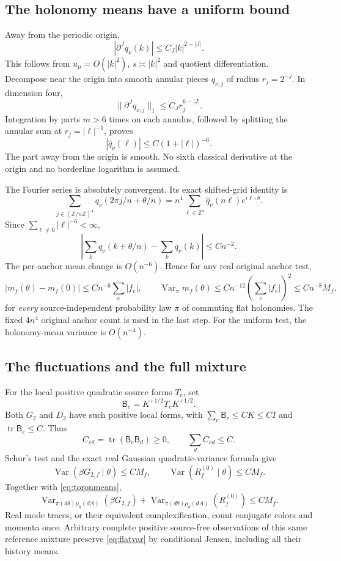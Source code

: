 \documentclass[11pt,letterpaper]{article}
\theoremstyle{remark}\newtheorem{remark}[theorem]{Remark}
\newcommand{\Var}{\operatorname{Var}}\newcommand{\Cov}{\operatorname{Cov}}
\newcommand{\tr}{\operatorname{tr}}
\begin{document}
\subsection{The holonomy means have a uniform bound}

Away from the periodic origin,
\[
 |\partial^Jq_\nu(k)|\le C_J|k|^{2-|J|}.
\]
This follows from \(u_\mu=O(|k|^2)\), \(s\asymp|k|^2\) and quotient differentiation. Decompose near the origin into smooth annular pieces \(q_{\nu,j}\) of radius \(r_j=2^{-j}\). In dimension four,
\[
 \|\partial^Jq_{\nu,j}\|_1\le C_Jr_j^{6-|J|}.
\]
Integration by parts \(m>6\) times on each annulus, followed by splitting the annular sum at \(r_j=|\ell|^{-1}\), proves
\[
 |\widehat q_\nu(\ell)|\le C(1+|\ell|)^{-6}.
\]
The part away from the origin is smooth. No sixth classical derivative at the origin and no borderline logarithm is assumed.

The Fourier series is absolutely convergent. Its exact shifted-grid identity is
\[
 \sum_{j\in(\mathbb Z/n\mathbb Z)^4}
 q_\nu(2\pi j/n+\theta/n)
 =n^4\sum_{\ell\in\mathbb Z^4}
 \widehat q_\nu(n\ell)e^{i\ell\cdot\theta}.
\]
Since \(\sum_{\ell\ne0}|\ell|^{-6}<\infty\),
\[
 \left|\sum_kq_\nu(k+\theta/n)-\sum_kq_\nu(k)\right|
 \le Cn^{-2}.
\]
The per-anchor mean change is \(O(n^{-6})\). Hence for any real original anchor test,
\begin{equation}\label{eq:toronmeans}
 |m_f(\theta)-m_f(0)|\le Cn^{-6}\sum_e|f_e|,
 \qquad
 \Var_\pi m_f(\theta)
 \le Cn^{-12}\left(\sum_e|f_e|\right)^2
 \le Cn^{-8}M_f,
\end{equation}
for \emph{every} source-independent probability law \(\pi\) of commuting flat holonomies. The fixed \(4n^4\) original anchor count is used in the last step. For the uniform test, the holonomy-mean variance is \(O(n^{-4})\).

\subsection{The fluctuations and the full mixture}

For the local positive quadratic source forms \(T_e\), set
\[
 \mathsf B_e=K^{+1/2}T_eK^{+1/2}.
\]
Both \(G_2\) and \(D_2\) have such positive local forms, with
\(\sum_e\mathsf B_e\le CK\le CI\) and \(\tr\mathsf B_e\le C\). Thus
\[
 C_{ed}=\tr(\mathsf B_e\mathsf B_d)\ge0,\qquad
 \sum_d C_{ed}\le C.
\]
Schur's test and the exact real Gaussian quadratic-variance formula give
\[
 \Var(\beta G_{2,f}\mid\theta)\le CM_f,\qquad
 \Var(R_f^{(0)}\mid\theta)\le CM_f.
\]
Together with \eqref{eq:toronmeans},
\begin{equation}\label{eq:flatvar}
 \boxed{\quad
 \Var_{\pi(d\theta)\mu_\theta(dA)}(\beta G_{2,f})
 +\Var_{\pi(d\theta)\mu_\theta(dA)}(R_f^{(0)})
 \le CM_f.
 \quad}
\end{equation}
Real mode traces, or their equivalent complexification, count conjugate colors and momenta once. Arbitrary complete positive source-free observations of this same reference mixture preserve \eqref{eq:flatvar} by conditional Jensen, including all their history means.
\end{document}
